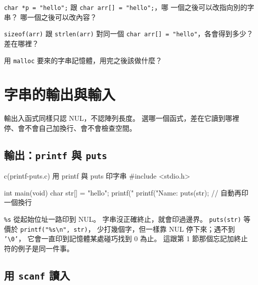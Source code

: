 
\begin{drills}[label=drills:str-declare-storage]
\item \texttt{char *p = "hello";} 跟 \texttt{char arr[] = "hello";}，哪
一個之後可以改指向別的字串？ 哪一個之後可以改內容？
\item \texttt{sizeof(arr)} 跟 \texttt{strlen(arr)} 對同一個
\texttt{char arr[] = "hello"}，各會得到多少？ 差在哪裡？
\item 用 \texttt{malloc} 要來的字串記憶體，用完之後該做什麼？
\end{drills}

\section{字串的輸出與輸入}
\label{sec:str-io}

輸出入函式同樣只認 NUL，不認陣列長度。 選哪一個函式，差在它讀到哪裡
停、會不會自己加換行、會不會檢查空間。

\subsection{輸出：\texttt{printf} 與 \texttt{puts}}

\begin{example}{c}{(printf-puts.c) 用 printf 與 puts 印字串}
#include <stdio.h>

int main(void) {
    char str[] = "hello";
    printf("%
    printf("Name: %
    puts(str);                 // 自動再印一個換行
}
\end{example}


\texttt{\%s} 從起始位址一路印到 NUL。 字串沒正確終止，就會印過邊界。
\texttt{puts(str)} 等價於 \texttt{printf("\%s\textbackslash n", str)}，
少打幾個字，但一樣靠 NUL 停下來；遇不到 \texttt{'\textbackslash 0'}，
它會一直印到記憶體某處碰巧找到 $0$ 為止。 這跟第 1 節那個忘記加終止
符的例子是同一件事。

\subsection{用 \texttt{scanf} 讀入}

